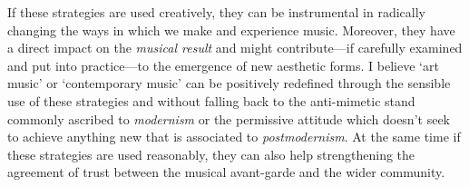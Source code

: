 If these strategies are used creatively, they can be instrumental in radically changing the ways in which we make and experience music. Moreover, they have a direct impact on the \emph{musical result} and might contribute---if carefully examined and put into practice---to the emergence of new aesthetic forms. I believe `art music' or `contemporary music' can be positively redefined through the sensible use of these strategies and without falling back to the anti-mimetic stand commonly ascribed to \emph{modernism} or the permissive attitude which doesn't seek to achieve anything new that is associated to \emph{postmodernism}. At the same time if these strategies are used reasonably, they can also help strengthening the agreement of trust between the musical avant-garde and the wider community.


\label{ch:motivation}